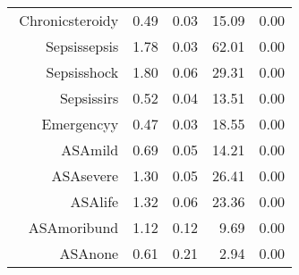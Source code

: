 \begin{tabular}{rrrrr}
$$  Chronic\-steroid\-y & 0.49 & 0.03 & 15.09 & 0.00 \\ 
  Sepsis\-sepsis & 1.78 & 0.03 & 62.01 & 0.00 \\ 
  Sepsis\-shock & 1.80 & 0.06 & 29.31 & 0.00 \\ 
  Sepsis\-sirs & 0.52 & 0.04 & 13.51 & 0.00 \\ 
  Emergency\-y & 0.47 & 0.03 & 18.55 & 0.00 \\ 
  ASA\-mild & 0.69 & 0.05 & 14.21 & 0.00 \\ 
  ASA\-severe & 1.30 & 0.05 & 26.41 & 0.00 \\ 
  ASA\-life & 1.32 & 0.06 & 23.36 & 0.00 \\ 
  ASA\-moribund & 1.12 & 0.12 & 9.69 & 0.00 \\ 
  ASA\-none & 0.61 & 0.21 & 2.94 & 0.00 \\ 
   \hline
\end{tabular}

